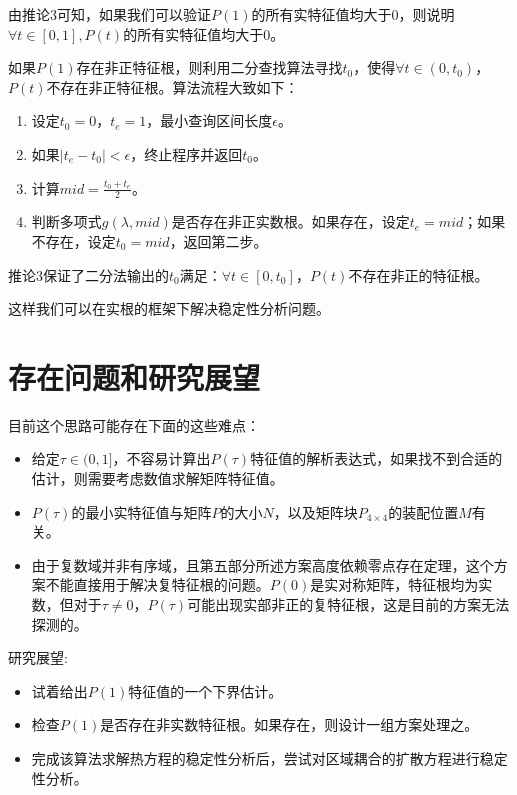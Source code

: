 \documentclass[UTF8]{ctexart}
\theoremstyle{plain}
\theoremstyle{definition}
\theoremstyle{remark}
\begin{document}
由推论3可知，如果我们可以验证$P(1)$的所有实特征值均大于0，则说明$\forall t\in[0,1],P(t)$的所有实特征值均大于0。

如果$P(1)$存在非正特征根，则利用二分查找算法寻找$t_{0}$，使得$\forall t\in(0,t_{0})$，$P(t)$不存在非正特征根。算法流程大致如下：

\begin{enumerate}
    \item 设定$t_{0}=0$，$t_{e}=1$，最小查询区间长度$\epsilon$。
    \item 如果$|t_{e}-t_{0}|<\epsilon$，终止程序并返回$t_{0}$。
    \item 计算$mid=\frac{t_{0}+t_{e}}{2}$。
    \item 判断多项式$g(\lambda,mid)$是否存在非正实数根。如果存在，设定$t_{e}=mid$；如果不存在，设定$t_{0}=mid$，返回第二步。
\end{enumerate}

推论3保证了二分法输出的$t_{0}$满足：$\forall t\in[0,t_{0}]$，$P(t)$不存在非正的特征根。

这样我们可以在实根的框架下解决稳定性分析问题。

\section{存在问题和研究展望}

目前这个思路可能存在下面的这些难点：
\begin{itemize}
    \item 给定$\tau\in(0,1]$，不容易计算出$P(\tau)$特征值的解析表达式，如果找不到合适的估计，则需要考虑数值求解矩阵特征值。
    \item $P(\tau)$的最小实特征值与矩阵$P$的大小$N$，以及矩阵块$P_{4\times 4}$的装配位置$M$有关。
    \item 由于复数域并非有序域，且第五部分所述方案高度依赖零点存在定理，这个方案不能直接用于解决复特征根的问题。$P(0)$是实对称矩阵，特征根均为实数，但对于$\tau\neq 0$，$P(\tau)$可能出现实部非正的复特征根，这是目前的方案无法探测的。
\end{itemize}

研究展望:
\begin{itemize}
    \item 试着给出$P(1)$特征值的一个下界估计。
    \item 检查$P(1)$是否存在非实数特征根。如果存在，则设计一组方案处理之。
    \item 完成该算法求解热方程的稳定性分析后，尝试对区域耦合的扩散方程进行稳定性分析。
\end{itemize}
\end{document}
